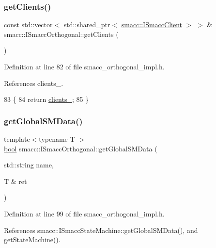 \subsubsection{\texorpdfstring{get\+Clients()}{getClients()}}
{\footnotesize\ttfamily const std\+::vector$<$ std\+::shared\+\_\+ptr$<$ \hyperlink{classsmacc_1_1ISmaccClient}{smacc\+::\+I\+Smacc\+Client} $>$ $>$ \& smacc\+::\+I\+Smacc\+Orthogonal\+::get\+Clients (\begin{DoxyParamCaption}{ }\end{DoxyParamCaption})\hspace{0.3cm}{\ttfamily [inline]}}



Definition at line 82 of file smacc\+\_\+orthogonal\+\_\+impl.\+h.



References clients\+\_\+.


\begin{DoxyCode}
83 \{
84     \textcolor{keywordflow}{return} \hyperlink{classsmacc_1_1ISmaccOrthogonal_a0f270e9c8c126198f6bce542ab4e04ba}{clients\_};
85 \}
\end{DoxyCode}
\mbox{\label{classsmacc_1_1ISmaccOrthogonal_aa763280bc6980811744c8e8f11b2dcd0}} 
\subsubsection{\texorpdfstring{get\+Global\+S\+M\+Data()}{getGlobalSMData()}}
{\footnotesize\ttfamily template$<$typename T $>$ \\
\hyperlink{classbool}{bool} smacc\+::\+I\+Smacc\+Orthogonal\+::get\+Global\+S\+M\+Data (\begin{DoxyParamCaption}\item[{std\+::string}]{name,  }\item[{T \&}]{ret }\end{DoxyParamCaption})}



Definition at line 99 of file smacc\+\_\+orthogonal\+\_\+impl.\+h.



References smacc\+::\+I\+Smacc\+State\+Machine\+::get\+Global\+S\+M\+Data(), and get\+State\+Machine().


